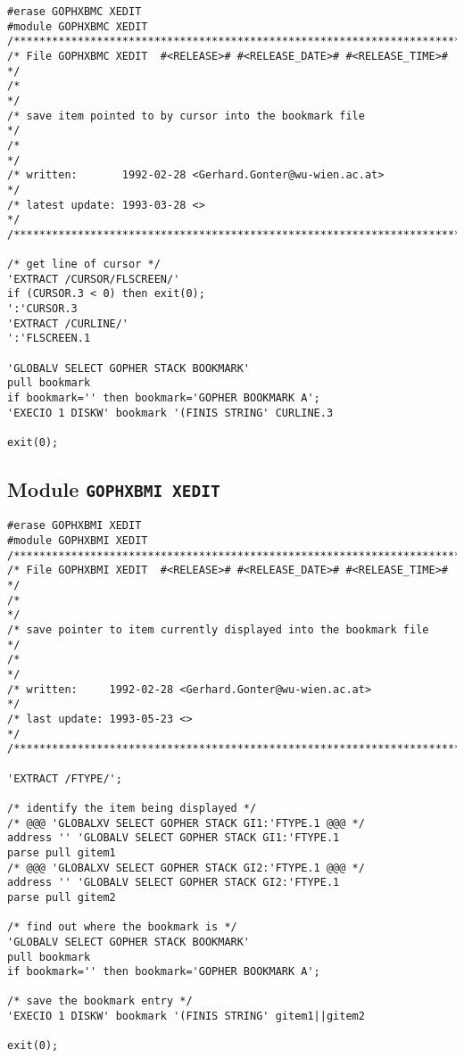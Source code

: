 \def\LPtopD{Module {\tt GOPHXBMC XEDIT}}

\def\LPtopF{~}

\begin{verbatim}
#erase GOPHXBMC XEDIT
#module GOPHXBMC XEDIT
/***********************************************************************/
/* File GOPHXBMC XEDIT  #<RELEASE># #<RELEASE_DATE># #<RELEASE_TIME># */
/*                                                                     */
/* save item pointed to by cursor into the bookmark file               */
/*                                                                     */
/* written:       1992-02-28 <Gerhard.Gonter@wu-wien.ac.at>            */
/* latest update: 1993-03-28 <>                                        */
/***********************************************************************/

/* get line of cursor */
'EXTRACT /CURSOR/FLSCREEN/'
if (CURSOR.3 < 0) then exit(0);
':'CURSOR.3
'EXTRACT /CURLINE/'
':'FLSCREEN.1

'GLOBALV SELECT GOPHER STACK BOOKMARK'
pull bookmark
if bookmark='' then bookmark='GOPHER BOOKMARK A';
'EXECIO 1 DISKW' bookmark '(FINIS STRING' CURLINE.3

exit(0);
\end{verbatim}

\subsection{Module {\tt GOPHXBMI XEDIT}}

\def\LPtopD{Module {\tt GOPHXBMI XEDIT}}

\def\LPtopF{~}

\begin{verbatim}
#erase GOPHXBMI XEDIT
#module GOPHXBMI XEDIT
/***********************************************************************/
/* File GOPHXBMI XEDIT  #<RELEASE># #<RELEASE_DATE># #<RELEASE_TIME>#  */
/*                                                                     */
/* save pointer to item currently displayed into the bookmark file     */
/*                                                                     */
/* written:     1992-02-28 <Gerhard.Gonter@wu-wien.ac.at>              */
/* last update: 1993-05-23 <>                                          */
/***********************************************************************/

'EXTRACT /FTYPE/';

/* identify the item being displayed */
/* @@@ 'GLOBALXV SELECT GOPHER STACK GI1:'FTYPE.1 @@@ */
address '' 'GLOBALV SELECT GOPHER STACK GI1:'FTYPE.1
parse pull gitem1
/* @@@ 'GLOBALXV SELECT GOPHER STACK GI2:'FTYPE.1 @@@ */
address '' 'GLOBALV SELECT GOPHER STACK GI2:'FTYPE.1
parse pull gitem2

/* find out where the bookmark is */
'GLOBALV SELECT GOPHER STACK BOOKMARK'
pull bookmark
if bookmark='' then bookmark='GOPHER BOOKMARK A';

/* save the bookmark entry */
'EXECIO 1 DISKW' bookmark '(FINIS STRING' gitem1||gitem2

exit(0);
\end{verbatim}

